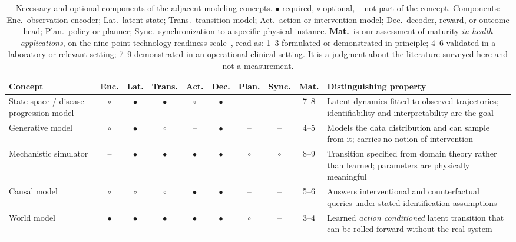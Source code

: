 \documentclass[journal]{IEEEtran}
\newif\ifsubmission
\begin{document}
\ifsubmission\else
\begin{table}[t]
\centering
\caption{Necessary and optional components of the adjacent modeling concepts. $\bullet$ required, $\circ$ optional, -- not part of the concept. Components: Enc.\ observation encoder; Lat.\ latent state; Trans.\ transition model; Act.\ action or intervention model; Dec.\ decoder, reward, or outcome head; Plan.\ policy or planner; Sync.\ synchronization to a specific physical instance. \textbf{Mat.}\ is our assessment of maturity \emph{in health applications}, on the nine-point technology readiness scale~\cite{ISO2013TRL}, read as: 1--3 formulated or demonstrated in principle; 4--6 validated in a laboratory or relevant setting; 7--9 demonstrated in an operational clinical setting. It is a judgment about the literature surveyed here and not a measurement.}
\label{tab:wm-taxonomy}
\footnotesize
\setlength{\tabcolsep}{4pt}
\renewcommand{\arraystretch}{1.15}
\begin{tabularx}{\textwidth}{>{\raggedright\arraybackslash}p{4.1cm} ccccccc c >{\raggedright\arraybackslash}X}
\toprule
\textbf{Concept} & \textbf{Enc.} & \textbf{Lat.} & \textbf{Trans.} & \textbf{Act.} & \textbf{Dec.} & \textbf{Plan.} & \textbf{Sync.} & \textbf{Mat.} & \textbf{Distinguishing property} \\
\midrule
State-space / disease-progression model & $\circ$ & $\bullet$ & $\bullet$ & $\circ$ & $\bullet$ & -- & -- & 7--8 & Latent dynamics fitted to observed trajectories; identifiability and interpretability are the goal \\
\addlinespace[2pt]
Generative model & $\circ$ & $\bullet$ & $\circ$ & -- & $\bullet$ & -- & -- & 4--5 & Models the data distribution and can sample from it; carries no notion of intervention \\
\addlinespace[2pt]
Mechanistic simulator & -- & $\bullet$ & $\bullet$ & $\bullet$ & $\bullet$ & $\circ$ & $\circ$ & 8--9 & Transition specified from domain theory rather than learned; parameters are physically meaningful \\
\addlinespace[2pt]
Causal model & $\circ$ & $\circ$ & $\circ$ & $\bullet$ & $\bullet$ & -- & -- & 5--6 & Answers interventional and counterfactual queries under stated identification assumptions \\
\addlinespace[2pt]
World model & $\bullet$ & $\bullet$ & $\bullet$ & $\bullet$ & $\bullet$ & $\circ$ & -- & 3--4 & Learned \emph{action conditioned} latent transition that can be rolled forward without the real system \\

\end{tabularx}
\end{table}
\end{document}
